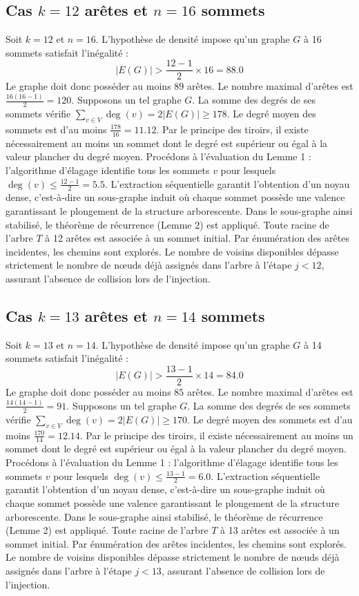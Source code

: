 \documentclass[12pt,a4paper]{article}
\begin{document}
\subsection{Cas $k = 12$ arêtes et $n = 16$ sommets}
Soit $k = 12$ et $n = 16$. L'hypothèse de densité impose qu'un graphe $G$ à 16 sommets satisfait l'inégalité :
$$ |E(G)| > \frac{12-1}{2} \times 16 = 88.0 $$
Le graphe doit donc posséder au moins $89$ arêtes. Le nombre maximal d'arêtes est $\frac{16(16-1)}{2} = 120$.
Supposons un tel graphe $G$. La somme des degrés de ses sommets vérifie $\sum_{v \in V} \deg(v) = 2|E(G)| \geq 178$.
Le degré moyen des sommets est d'au moins $\frac{178}{16} = 11.12$.
Par le principe des tiroirs, il existe nécessairement au moins un sommet dont le degré est supérieur ou égal à la valeur plancher du degré moyen.
Procédons à l'évaluation du Lemme 1 : l'algorithme d'élagage identifie tous les sommets $v$ pour lesquels $\deg(v) \leq \frac{12-1}{2} = 5.5$.
L'extraction séquentielle garantit l'obtention d'un noyau dense, c'est-à-dire un sous-graphe induit où chaque sommet possède une valence garantissant le plongement de la structure arborescente.
Dans le sous-graphe ainsi stabilisé, le théorème de récurrence (Lemme 2) est appliqué. Toute racine de l'arbre $T$ à 12 arêtes est associée à un sommet initial. Par énumération des arêtes incidentes, les chemins sont explorés. Le nombre de voisins disponibles dépasse strictement le nombre de nœuds déjà assignés dans l'arbre à l'étape $j < 12$, assurant l'absence de collision lors de l'injection.

\subsection{Cas $k = 13$ arêtes et $n = 14$ sommets}
Soit $k = 13$ et $n = 14$. L'hypothèse de densité impose qu'un graphe $G$ à 14 sommets satisfait l'inégalité :
$$ |E(G)| > \frac{13-1}{2} \times 14 = 84.0 $$
Le graphe doit donc posséder au moins $85$ arêtes. Le nombre maximal d'arêtes est $\frac{14(14-1)}{2} = 91$.
Supposons un tel graphe $G$. La somme des degrés de ses sommets vérifie $\sum_{v \in V} \deg(v) = 2|E(G)| \geq 170$.
Le degré moyen des sommets est d'au moins $\frac{170}{14} = 12.14$.
Par le principe des tiroirs, il existe nécessairement au moins un sommet dont le degré est supérieur ou égal à la valeur plancher du degré moyen.
Procédons à l'évaluation du Lemme 1 : l'algorithme d'élagage identifie tous les sommets $v$ pour lesquels $\deg(v) \leq \frac{13-1}{2} = 6.0$.
L'extraction séquentielle garantit l'obtention d'un noyau dense, c'est-à-dire un sous-graphe induit où chaque sommet possède une valence garantissant le plongement de la structure arborescente.
Dans le sous-graphe ainsi stabilisé, le théorème de récurrence (Lemme 2) est appliqué. Toute racine de l'arbre $T$ à 13 arêtes est associée à un sommet initial. Par énumération des arêtes incidentes, les chemins sont explorés. Le nombre de voisins disponibles dépasse strictement le nombre de nœuds déjà assignés dans l'arbre à l'étape $j < 13$, assurant l'absence de collision lors de l'injection.
\end{document}
